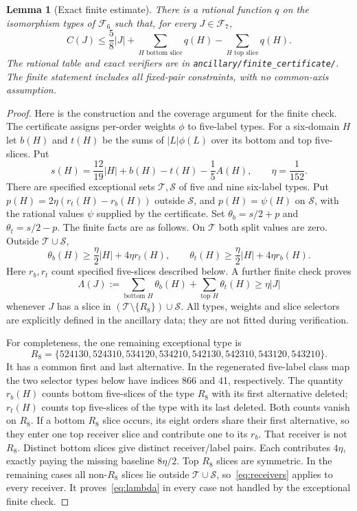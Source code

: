 \documentclass[11pt,letterpaper]{article}
\newtheorem{lemma}[theorem]{Lemma}
\theoremstyle{remark}\newtheorem{remark}[theorem]{Remark}
\newcommand{\F}{\mathcal F}
\begin{document}
\begin{lemma}[Exact finite estimate]\label{lem:finite}
There is a rational function $q$ on the isomorphism types of $\F_6$ such
that, for every $J\in\F_7$,
\begin{equation}\label{eq:finite}
 C(J)\le\frac58|J|+
 \sum_{H\text{ bottom slice}}q(H)-\sum_{H\text{ top slice}}q(H).
\end{equation}
The rational table and exact verifiers are in
\texttt{ancillary/finite\_certificate/}. The finite statement includes
all fixed-pair constraints, with no common-axis assumption.
\end{lemma}
\begin{proof}
Here is the construction and the coverage argument for the finite check.
The certificate assigns per-order weights $\phi$ to five-label types.
For a six-domain $H$ let $b(H)$ and $t(H)$ be the sums of
$|L|\phi(L)$ over its bottom and top five-slices. Put
\[
 s(H)=\frac{12}{19}|H|+b(H)-t(H)-\frac15 A(H),\qquad \eta=\frac1{152}.
\]
There are specified exceptional sets $\mathcal T,\mathcal S$ of five and
nine six-label types. Put $p(H)=2\eta(r_t(H)-r_b(H))$ outside $\mathcal S$,
and $p(H)=\psi(H)$ on $\mathcal S$, with the rational values $\psi$ supplied
by the certificate. Set $\theta_b=s/2+p$ and $\theta_t=s/2-p$.
The finite facts are as follows. On $\mathcal T$
both split values are zero. Outside $\mathcal T\cup\mathcal S$,
\begin{equation}\label{eq:receivers}
 \theta_b(H)\ge\frac\eta2|H|+4\eta r_t(H),\qquad
 \theta_t(H)\ge\frac\eta2|H|+4\eta r_b(H).
\end{equation}
Here $r_b,r_t$ count specified five-slices described below. A further
finite check proves
\begin{equation}\label{eq:lambda}
 \Lambda(J):=\sum_{\text{bottom }H}\theta_b(H)
             +\sum_{\text{top }H}\theta_t(H)\ge\eta|J|
\end{equation}
whenever $J$ has a slice in $(\mathcal T\setminus\{R_8\})\cup\mathcal S$.
All types, weights and slice selectors are explicitly defined in the
ancillary data; they are not fitted during verification.

For completeness, the one remaining exceptional type is
\[
 R_8=\{524130,524310,534120,534210,
        542130,542310,543120,543210\}.
\]
It has a common first and last alternative. In the regenerated five-label
class map the two selector types below have indices 866 and 41, respectively. The quantity $r_b(H)$ counts
bottom five-slices of the type $R_8$ with its first alternative deleted;
$r_t(H)$ counts top five-slices of the type with its last deleted.
Both counts vanish on $R_8$.
If a bottom $R_8$ slice occurs, its eight orders share their first
alternative, so they enter one top receiver slice and contribute one
to its $r_b$. That receiver is not $R_8$. Distinct bottom slices give
distinct receiver/label pairs. Each contributes $4\eta$, exactly paying
the missing baseline $8\eta/2$. Top $R_8$ slices are symmetric.
In the remaining cases all non-$R_8$ slices lie outside
$\mathcal T\cup\mathcal S$, so~\eqref{eq:receivers} applies to every receiver.
It proves~\eqref{eq:lambda} in every case not handled by the exceptional finite check.


\end{proof}
\end{document}
